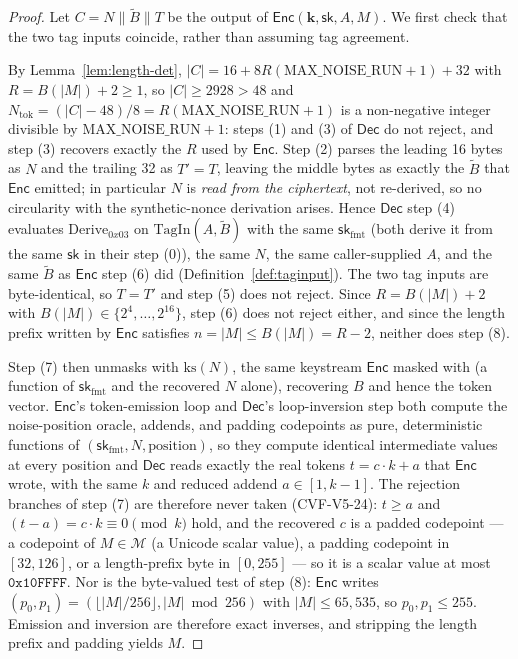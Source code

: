 \documentclass[11pt,a4paper]{article}
\begin{document}
\begin{proof}
Let $C=N\|\widetilde{B}\|T$ be the output of
$\mathsf{Enc}(\mathbf{k},\mathsf{sk},A,M)$. We first check that the two tag
inputs coincide, rather than assuming tag agreement.

By Lemma~\ref{lem:length-det}, $|C|=16+8R(\mathrm{MAX\_NOISE\_RUN}+1)+32$
with $R=B(|M|)+2\ge1$, so $|C|\ge2928>48$ and
$N_{\mathrm{tok}}=(|C|-48)/8=R(\mathrm{MAX\_NOISE\_RUN}+1)$ is a
non-negative integer divisible by $\mathrm{MAX\_NOISE\_RUN}+1$: steps (1)
and (3) of $\mathsf{Dec}$ do not reject, and step (3) recovers exactly the
$R$ used by $\mathsf{Enc}$. Step (2) parses the leading 16 bytes as $N$ and
the trailing 32 as $T'=T$, leaving the middle bytes as exactly the
$\widetilde{B}$ that $\mathsf{Enc}$ emitted; in particular $N$ is
\emph{read from the ciphertext}, not re-derived, so no circularity with the
synthetic-nonce derivation arises. Hence $\mathsf{Dec}$ step (4) evaluates
$\mathrm{Derive}_{0x03}$ on $\mathrm{TagIn}(A,\widetilde{B})$ with the same
$\mathsf{sk}_{\mathrm{fmt}}$ (both derive it from the same $\mathsf{sk}$
in their step (0)), the same $N$, the same caller-supplied $A$, and the same
$\widetilde{B}$ as $\mathsf{Enc}$ step (6) did
(Definition~\ref{def:taginput}). The two tag inputs are byte-identical, so
$T=T'$ and step (5) does not reject. Since $R=B(|M|)+2$ with
$B(|M|)\in\{2^4,\ldots,2^{16}\}$, step (6) does not reject either, and since
the length prefix written by $\mathsf{Enc}$ satisfies $n=|M|\le B(|M|)=R-2$,
neither does step (8).

Step (7) then unmasks with $\mathrm{ks}(N)$, the same keystream
$\mathsf{Enc}$ masked with (a function of $\mathsf{sk}_{\mathrm{fmt}}$ and
the recovered $N$ alone), recovering $B$ and hence the token vector.
$\mathsf{Enc}$'s token-emission loop and $\mathsf{Dec}$'s loop-inversion
step both compute the noise-position oracle, addends, and padding
codepoints as pure, deterministic functions of
$(\mathsf{sk}_{\mathrm{fmt}},N,\mathrm{position})$, so they compute
identical intermediate values at every position and $\mathsf{Dec}$ reads
exactly the real tokens $t=c\cdot k+a$ that $\mathsf{Enc}$ wrote, with the
same $k$ and reduced addend $a\in[1,k-1]$. The rejection branches of step
(7) are therefore never taken (CVF-V5-24): $t\ge a$ and
$(t-a)=c\cdot k\equiv0\pmod k$ hold, and the recovered $c$ is a padded
codepoint — a codepoint of $M\in\mathcal{M}$ (a Unicode scalar value), a
padding codepoint in $[32,126]$, or a length-prefix byte in $[0,255]$ —
so it is a scalar value at most $\mathtt{0x10FFFF}$. Nor is the
byte-valued test of step (8): $\mathsf{Enc}$ writes
$(p_0,p_1)=(\lfloor|M|/256\rfloor,|M|\bmod256)$ with $|M|\le65{,}535$, so
$p_0,p_1\le255$. Emission and inversion are therefore exact inverses, and
stripping the length prefix and padding yields $M$.
\end{proof}
\end{document}
